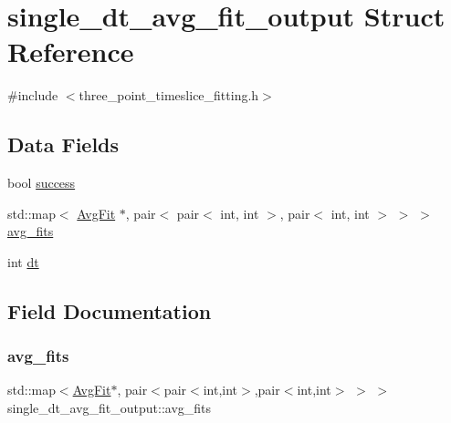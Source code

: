 \hypertarget{structsingle__dt__avg__fit__output}{}\section{single\+\_\+dt\+\_\+avg\+\_\+fit\+\_\+output Struct Reference}
\label{structsingle__dt__avg__fit__output}


{\ttfamily \#include $<$three\+\_\+point\+\_\+timeslice\+\_\+fitting.\+h$>$}

\subsection*{Data Fields}
\begin{DoxyCompactItemize}
\item 
bool \mbox{\hyperlink{structsingle__dt__avg__fit__output_a63196f562c667944bbfac71206801a31}{success}}
\item 
std\+::map$<$ \mbox{\hyperlink{classAvgFit}{Avg\+Fit}} $\ast$, pair$<$ pair$<$ int, int $>$, pair$<$ int, int $>$ $>$ $>$ \mbox{\hyperlink{structsingle__dt__avg__fit__output_a1c3e4fc8db26db2944c48684f2729f25}{avg\+\_\+fits}}
\item 
int \mbox{\hyperlink{structsingle__dt__avg__fit__output_a4c7b1b164a40706fc8853e8ccfcf536b}{dt}}
\end{DoxyCompactItemize}


\subsection{Field Documentation}
\mbox{\label{structsingle__dt__avg__fit__output_a1c3e4fc8db26db2944c48684f2729f25}} 
\subsubsection{\texorpdfstring{avg\_fits}{avg\_fits}}
{\footnotesize\ttfamily std\+::map$<$\mbox{\hyperlink{classAvgFit}{Avg\+Fit}}$\ast$, pair$<$pair$<$int,int$>$,pair$<$int,int$>$ $>$ $>$ single\+\_\+dt\+\_\+avg\+\_\+fit\+\_\+output\+::avg\+\_\+fits}

\mbox{\label{structsingle__dt__avg__fit__output_a4c7b1b164a40706fc8853e8ccfcf536b}} 
